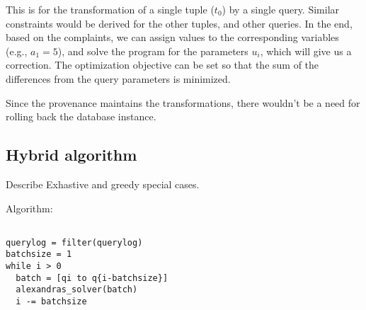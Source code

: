\smallskip 

This is for the transformation of a single tuple ($t_0$) by a single query.
Similar constraints would be derived for the other tuples, and other queries.
In the end, based on the complaints, we can assign values to the corresponding
variables (e.g., $a_1=5$), and solve the program for the parameters $u_i$,
which will give us a correction. The optimization objective can be set so that
the sum of the differences from the query parameters is minimized.

\smallskip

Since the provenance maintains the transformations, there wouldn't be a need
for rolling back the database instance.



\subsection{Hybrid algorithm}

Describe Exhastive and greedy special cases.


Algorithm:

\begin{verbatim}

querylog = filter(querylog)
batchsize = 1
while i > 0
  batch = [qi to q{i-batchsize}]
  alexandras_solver(batch)
  i -= batchsize

\end{verbatim}
